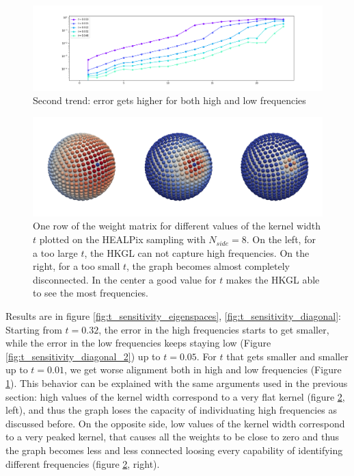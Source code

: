 \begin{figure}
	\centering
	\includegraphics[width=\textwidth]{../codes/02.HeatKernelGraphLaplacian/HEALPix/06_figures/t_sensitivity_diagonal_1.png}
	\caption{\label{fig:t_sensitivity_diagonal_1}Second trend: error gets higher for both high and low frequencies}
\end{figure}%
\begin{figure}[h!]
	\centering
	\includegraphics[width=\textwidth]{figs/chapter1/t.png}	
	\caption{\label{fig:weights}One row of the weight matrix for different values of the kernel width $t$ plotted on the HEALPix sampling with $N_{side}=8$. On the left, for a too large $t$, the HKGL can not capture high frequencies. On the right, for a too small $t$, the graph becomes almost completely disconnected. In the center a good value for $t$ makes the HKGL able to see the most frequencies.}
\end{figure}

Results are in figure \ref{fig:t_sensitivity_eigenspaces}, \ref{fig:t_sensitivity_diagonal}: Starting from $t=0.32$, the error in the high frequencies starts to get smaller, while the error in the low frequencies keeps staying low (Figure \ref{fig:t_sensitivity_diagonal_2}) up to $t=0.05$. For $t$ that gets smaller and smaller up to $t=0.01$, we get worse alignment both in high and low frequencies (Figure \ref{fig:t_sensitivity_diagonal_1}). This behavior can be explained with the same arguments used in the previous section: high values of the kernel width correspond to a very flat kernel (figure \ref{fig:weights}, left), and thus the graph loses the capacity of individuating high frequencies as discussed before. On the opposite side, low values of the kernel width correspond to a very peaked kernel, that causes all the weights to be close to zero and thus the graph becomes less and less connected loosing every capability of identifying different frequencies  (figure \ref{fig:weights}, right). 


